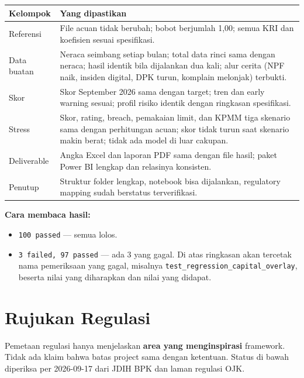 \documentclass[11pt,a4paper]{article}
\begin{document}
\begin{longtable}{>{\raggedright\arraybackslash}p{4.3cm}>{\raggedright\arraybackslash}p{10.5cm}}
\toprule
\textbf{Kelompok} & \textbf{Yang dipastikan} \\
\midrule
\endhead
Referensi & File acuan tidak berubah; bobot berjumlah 1,00; semua KRI dan koefisien sesuai spesifikasi. \\
Data buatan & Neraca seimbang setiap bulan; total data rinci sama dengan neraca; hasil identik bila dijalankan dua kali; alur cerita (NPF naik, insiden digital, DPK turun, komplain melonjak) terbukti. \\
Skor & Skor September 2026 sama dengan target; tren dan early warning sesuai; profil risiko identik dengan ringkasan spesifikasi. \\
Stress & Skor, rating, breach, pemakaian limit, dan KPMM tiga skenario sama dengan perhitungan acuan; skor tidak turun saat skenario makin berat; tidak ada model di luar cakupan. \\
Deliverable & Angka Excel dan laporan PDF sama dengan file hasil; paket Power BI lengkap dan relasinya konsisten. \\
Penutup & Struktur folder lengkap, notebook bisa dijalankan, regulatory mapping sudah berstatus terverifikasi. \\
\bottomrule
\end{longtable}

\textbf{Cara membaca hasil:}
\begin{itemize}
\item \texttt{100 passed} --- semua lolos.
\item \texttt{3 failed, 97 passed} --- ada 3 yang gagal. Di atas ringkasan akan tercetak nama pemeriksaan yang gagal, misalnya \texttt{test\_\allowbreak{}regression\_\allowbreak{}capital\_\allowbreak{}overlay}, beserta nilai yang diharapkan dan nilai yang didapat.
\end{itemize}
\section{Rujukan Regulasi}\label{sec:regulasi}

Pemetaan regulasi hanya menjelaskan \textbf{area yang menginspirasi} framework. Tidak ada klaim bahwa batas project sama dengan ketentuan. Status di bawah diperiksa per 2026-09-17 dari JDIH BPK dan laman regulasi OJK.
\end{document}
